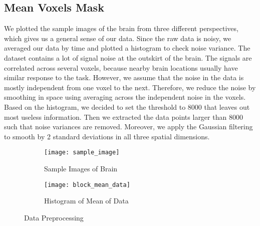 \subsection{Mean Voxels Mask}

We plotted the sample images of the brain from three different perspectives, which 
gives us a general sense of our data. Since the raw data is noisy, we averaged our 
data by time and plotted a histogram to check noise 
variance. The dataset contains a lot of signal noise at the outskirt of the 
brain. The signals are correlated across several voxels, because nearby 
brain locations usually have similar response to the task. However, we assume 
that the noise in the data is mostly independent from one voxel to the next. 
Therefore, we reduce the noise by smoothing in space using averaging across the 
independent noise in the voxels. Based on the histogram, we decided to set the 
threshold to 8000 that leaves out most useless information. Then we extracted the 
data points larger than 8000 such that noise variances are removed. Moreover, 
we apply the Gaussian filtering to smooth by 2 standard deviations in all three 
spatial dimensions.

\begin{figure}[!h]
\centering
\begin{subfigure}{.45\textwidth}
  \texttt{[image: sample\_image]}
  \caption{Sample Images of Brain}
\end{subfigure}%
\begin{subfigure}{.6\textwidth}
  \texttt{[image: block\_mean\_data]}
  \centering
  \caption{Histogram of Mean of Data}
\end{subfigure}
\caption{Data Preprocessing\label{fig:datapre}}
\end{figure}


